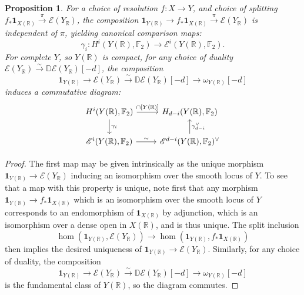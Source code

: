 \documentclass{amsart}
\newtheorem{prop}[thm]{Proposition}
\theoremstyle{definition}
\theoremstyle{remark}
\begin{document}
\begin{prop}\label{Prop:factorise cap product}
For a choice of resolution $f:X\to Y$, and choice of splitting $f_*\mathbf{1}_{X(\mathbb{R})}\xrightarrow{\pi}\mathscr{E}(Y_\mathbb{R})$, the composition $\mathbf{1}_{Y(\mathbb{R})}\to f_*\mathbf{1}_{X(\mathbb{R})}\xrightarrow{\pi} \mathscr{E}(Y_\mathbb{R})$ is independent of $\pi$, yielding canonical comparison maps: \[\gamma_i:H^i(Y(\mathbb{R}),\mathbb{F}_2)\to \mathscr{E}^i(Y(\mathbb{R}),\mathbb{F}_2).\]
For complete $Y$, so $Y(\mathbb{R})$ is compact, for any choice of duality $\mathscr{E}(Y_\mathbb{R})\xrightarrow{\sim}\mathbb{D}\mathscr{E}(Y_\mathbb{R})[-d]$, the composition \[\mathbf{1}_{Y(\mathbb{R})}\to \mathscr{E}(Y_\mathbb{R})\xrightarrow{\sim}\mathbb{D}\mathscr{E}(Y_\mathbb{R})[-d]\to \omega_{Y(\mathbb{R})}[-d]\] induces a commutative diagram:
\[\begin{tikzcd}
H^i(Y(\mathbb{R}),\mathbb{F}_2)\arrow[r,"\cap \text{[}Y(\mathbb{R})\text{]} "]\arrow[d,"\gamma_i"]&H_{d-i}(Y(\mathbb{R}),\mathbb{F}_2)\\
\mathscr{E}^i(Y(\mathbb{R}),\mathbb{F}_2)\arrow[r,"\sim"]&\mathscr{E}^{d-i}(Y(\mathbb{R}),\mathbb{F}_2)^\vee\arrow[u,"\gamma_{d-i}^\vee"']
\end{tikzcd}\]

\end{prop}

\begin{proof}
The first map may be given intrinsically as the unique morphism $\mathbf{1}_{Y(\mathbb{R})}\to \mathscr{E}(Y_\mathbb{R})$ inducing an isomorphism over the smooth locus of $Y$. To see that a map with this property is unique, note first that any morphism $\mathbf{1}_{Y(\mathbb{R})}\to f_*\mathbf{1}_{X(\mathbb{R})}$ which is an isomorphism over the smooth locus of $Y$ corresponds to an endomorphism of $\mathbf{1}_{X(\mathbb{R})}$ by adjunction, which is an isomorphism over a dense open in $X(\mathbb{R})$, and is thus unique. The split inclusion \[\hom(\mathbf{1}_{Y(\mathbb{R})},\mathscr{E}(Y_\mathbb{R}))\to \hom(\mathbf{1}_{Y(\mathbb{R})},f_*\mathbf{1}_{X(\mathbb{R})})\] then implies the desired uniqueness of $\mathbf{1}_{Y(\mathbb{R})}\to \mathscr{E}(Y_\mathbb{R})$. Similarly, for any choice of duality, the composition \[\mathbf{1}_{Y(\mathbb{R})}\to \mathscr{E}(Y_\mathbb{R})\xrightarrow{\sim}\mathbb{D}\mathscr{E}(Y_\mathbb{R})[-d]\to \omega_{Y(\mathbb{R})}[-d]\] is the fundamental class of $Y(\mathbb{R})$, so the diagram commutes.
\end{proof}
\end{document}
